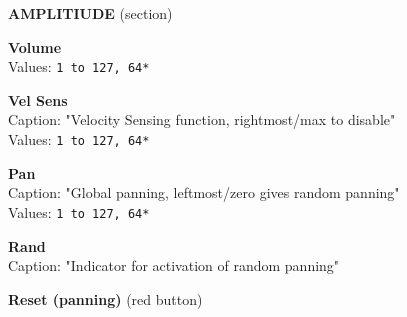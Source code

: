 \documentclass[
 11pt,
 twoside,
 a4paper,
 headinclude,
 footinclude,
 final                                 %
]{article}
\begin{document}
\begin{enumber}
\begin{enumber}

         \item \textbf{AMPLITIUDE} (section)
         \begin{enumber}
            \item \textbf{Volume} \\
               Values: \texttt{1 to 127, 64*}
            \item \textbf{Vel Sens} \\
               Caption: "Velocity Sensing function, rightmost/max to disable" \\
               Values: \texttt{1 to 127, 64*}
            \item \textbf{Pan} \\
               Caption: "Global panning, leftmost/zero gives random panning" \\
               Values: \texttt{1 to 127, 64*}
            \item \textbf{Rand} \\
               Caption: "Indicator for activation of random panning"
            \item \textbf{Reset (panning)} (red button)



\end{enumber}
\end{enumber}
\end{enumber}
\end{document}
